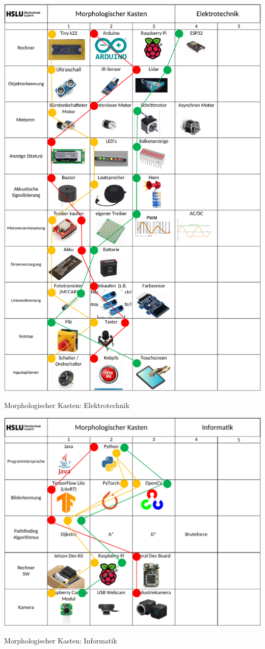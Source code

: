\begin{table}[H]
\centering
\includegraphics[height=\textheight-1cm]{assets/MK_Elektrotechnik.pdf}
\caption{Morphologischer Kasten: Elektrotechnik}
\label{table:MK-Elektrotechnik}
\end{table}
\newpage
\begin{table}[H]
\centering
\includegraphics[width=\textwidth]{assets/MK_Informatik.pdf}
\caption{Morphologischer Kasten: Informatik}
\label{table:MK-Informatik}
\end{table}
